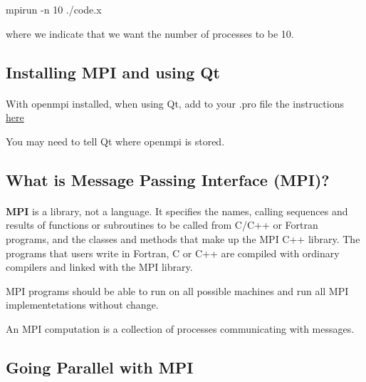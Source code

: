 \documentclass[%
oneside,                 %
final,                   %
10pt]{article}
\begin{document}
\bcppcod
  mpirun -n 10 ./code.x

\ecppcod

where we indicate that we want  the number of processes to be 10.



\subsection{Installing MPI and using Qt}

\paragraph{}
With openmpi installed, when using Qt, add to your .pro file the instructions \href{{http://dragly.org/2012/03/14/developing-mpi-applications-in-qt-creator/}}{here}

You may need to tell Qt where openmpi is stored.



\subsection{What is Message Passing Interface (MPI)?}

\paragraph{}

\textbf{MPI} is a library, not a language. It specifies the names, calling sequences and results of functions
or subroutines to be called from C/C++ or Fortran programs, and the classes and methods that make up the MPI C++
library. The programs that users write in Fortran, C or C++ are compiled with ordinary compilers and linked
with the MPI library.

MPI programs should be able to run
on all possible machines and run all MPI implementetations without change.

An MPI computation is a collection of processes communicating with messages.


\subsection{Going Parallel with MPI}

\end{document}
